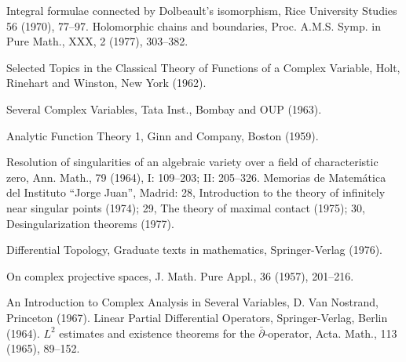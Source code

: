 \begin{sourcebibliography}
 Integral formulae connected by Dolbeault's isomorphism, Rice University Studies 56 (1970), 77--97.
 Holomorphic chains and boundaries, Proc. A.M.S. Symp. in Pure Math., XXX, 2 (1977), 303--382.
\end{sourcebibliography}
\begin{sourcebibliography}
 Selected Topics in the Classical Theory of Functions of a Complex Variable, Holt, Rinehart and Winston, New York (1962).
\end{sourcebibliography}
\begin{sourcebibliography}
 Several Complex Variables, Tata Inst., Bombay and OUP (1963).
\end{sourcebibliography}
\begin{sourcebibliography}
 Analytic Function Theory 1, Ginn and Company, Boston (1959).
\end{sourcebibliography}
\begin{sourcebibliography}
 Resolution of singularities of an algebraic variety over a field of characteristic zero, Ann. Math., 79 (1964), I: 109--203; II: 205--326.
 Memorias de Matem\'atica del Instituto ``Jorge Juan'', Madrid: 28, Introduction to the theory of infinitely near singular points (1974); 29, The theory of maximal contact (1975); 30, Desingularization theorems (1977).
\end{sourcebibliography}
\begin{sourcebibliography}
 Differential Topology, Graduate texts in mathematics, Springer-Verlag (1976).
\end{sourcebibliography}
\begin{sourcebibliography}
 On complex projective spaces, J. Math. Pure Appl., 36 (1957), 201--216.
\end{sourcebibliography}
\begin{sourcebibliography}
 An Introduction to Complex Analysis in Several Variables, D. Van Nostrand, Princeton (1967).
 Linear Partial Differential Operators, Springer-Verlag, Berlin (1964).
 $L^2$ estimates and existence theorems for the $\bar\partial$-operator, Acta. Math., 113 (1965), 89--152.
\end{sourcebibliography}
